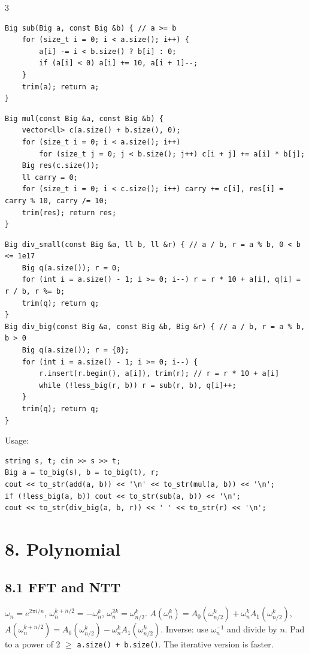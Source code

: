 \documentclass[8pt]{extarticle}
\begin{document}
\begin{multicols*}{3}
\begin{lstlisting}
Big sub(Big a, const Big &b) { // a >= b
    for (size_t i = 0; i < a.size(); i++) {
        a[i] -= i < b.size() ? b[i] : 0;
        if (a[i] < 0) a[i] += 10, a[i + 1]--;
    }
    trim(a); return a;
}
\end{lstlisting}

\begin{lstlisting}
Big mul(const Big &a, const Big &b) {
    vector<ll> c(a.size() + b.size(), 0);
    for (size_t i = 0; i < a.size(); i++)
        for (size_t j = 0; j < b.size(); j++) c[i + j] += a[i] * b[j];
    Big res(c.size());
    ll carry = 0;
    for (size_t i = 0; i < c.size(); i++) carry += c[i], res[i] = carry % 10, carry /= 10;
    trim(res); return res;
}
\end{lstlisting}

\begin{lstlisting}
Big div_small(const Big &a, ll b, ll &r) { // a / b, r = a % b, 0 < b <= 1e17
    Big q(a.size()); r = 0;
    for (int i = a.size() - 1; i >= 0; i--) r = r * 10 + a[i], q[i] = r / b, r %= b;
    trim(q); return q;
}
Big div_big(const Big &a, const Big &b, Big &r) { // a / b, r = a % b, b > 0
    Big q(a.size()); r = {0};
    for (int i = a.size() - 1; i >= 0; i--) {
        r.insert(r.begin(), a[i]), trim(r); // r = r * 10 + a[i]
        while (!less_big(r, b)) r = sub(r, b), q[i]++;
    }
    trim(q); return q;
}
\end{lstlisting}

Usage:

\begin{lstlisting}
string s, t; cin >> s >> t;
Big a = to_big(s), b = to_big(t), r;
cout << to_str(add(a, b)) << '\n' << to_str(mul(a, b)) << '\n';
if (!less_big(a, b)) cout << to_str(sub(a, b)) << '\n';
cout << to_str(div_big(a, b, r)) << ' ' << to_str(r) << '\n';
\end{lstlisting}

\section*{8. Polynomial}

\subsection*{8.1 FFT and NTT}

$\omega_n = e^{2\pi i/n}$, $\omega_n^{k + n/2} = -\omega_n^k$, $\omega_n^{2k} = \omega_{n/2}^k$.
$A(\omega_n^k) = A_0(\omega_{n/2}^k) + \omega_n^k A_1(\omega_{n/2}^k)$, $A(\omega_n^{k+n/2}) = A_0(\omega_{n/2}^k) - \omega_n^k A_1(\omega_{n/2}^k)$.
Inverse: use $\omega_n^{-1}$ and divide by $n$. Pad to a power of 2 $\ge$ \texttt{a.size() + b.size()}. The iterative version is faster.


\end{multicols*}
\end{document}
